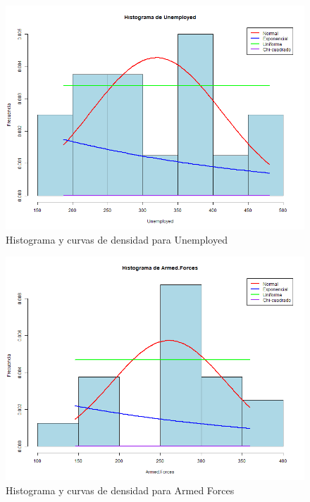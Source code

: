 \documentclass{article}
\begin{document}
\begin{figure}[H]
    \centering
    \includegraphics[width=\textwidth]{HistogramasDensidad/histograma_Unemployed.png}
    \caption{Histograma y curvas de densidad para Unemployed}
\end{figure}

\begin{figure}[H]
    \centering
    \includegraphics[width=\textwidth]{HistogramasDensidad/histograma_Armed.Forces.png}
    \caption{Histograma y curvas de densidad para Armed Forces}
\end{figure}
\end{document}
